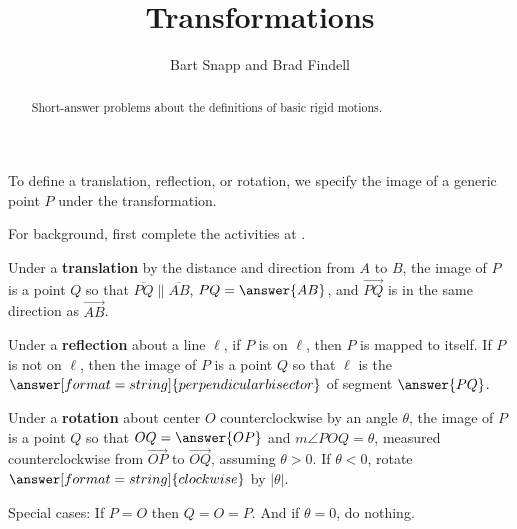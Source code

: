 \documentclass[nooutcomes]{ximera}
\title{Transformations}
\author{Bart Snapp and Brad Findell}
\begin{document}
\begin{abstract}
Short-answer problems about the definitions of basic rigid motions.
\end{abstract}
\maketitle

To define a translation, reflection, or rotation, we specify the image of a generic point $P$ under the transformation.  

For background, first complete the activities at .

\begin{question}
Under a \textbf{translation} by the distance and direction from $A$ to $B$, the image of $P$ is a point $Q$ so that $\overline{PQ} \parallel \overline{AB}$, $PQ=\answer{AB}$, and $\overrightarrow{PQ}$ is in the same direction as $\overrightarrow{AB}$.  
\end{question}

\begin{question}
Under a \textbf{reflection} about a line $\ell$, if $P$ is on $\ell$, then $P$ is mapped to itself.  If $P$ is not on $\ell$, then the image of $P$ is a point $Q$ so that $\ell$ is the 
$\answer[format=string]{perpendicular bisector}$ of segment $\answer{PQ}$.  
\end{question}

\begin{question}
Under a \textbf{rotation} about center $O$ counterclockwise by an angle $\theta$, the image of $P$ is 
a point $Q$ so that $OQ = \answer{OP}$ and $m\angle POQ = \theta$, measured counterclockwise 
from $\overrightarrow{OP}$ to $\overrightarrow{OQ}$, assuming $\theta>0$.  If $\theta<0$, rotate $\answer[format=string]{clockwise}$ by $|\theta|$.  

Special cases:  If $P = O$ then $Q=O=P$.  And if $\theta=0$, do nothing. 
\end{question}

\end{document}
